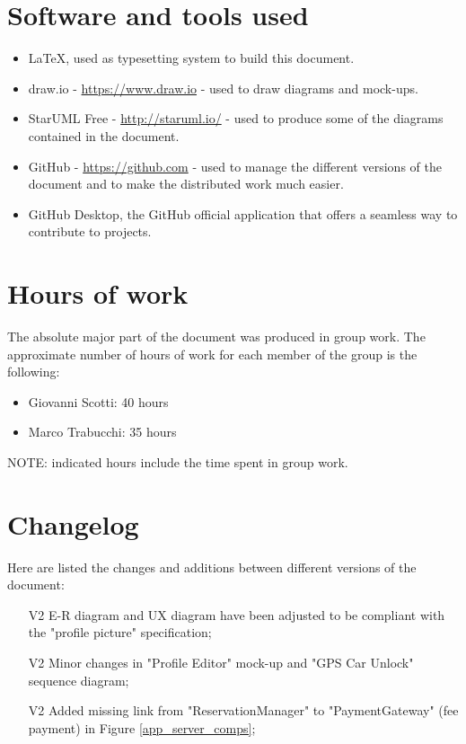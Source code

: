 \section{Software and tools used}
\begin{itemize}
\item \LaTeX, used as typesetting system to build this document.
\item draw.io - \url{https://www.draw.io} - used to draw diagrams and mock-ups.
\item StarUML Free - \url{http://staruml.io/} - used to produce some of the diagrams contained in the document.
\item GitHub - \url{https://github.com} - used to manage the different versions of the document and to make the distributed work much easier.
\item GitHub Desktop, the GitHub official application that offers a seamless way to contribute to projects.
\end{itemize}
\section{Hours of work}
The absolute major part of the document was produced in group work. The approximate number of hours of work for each member of the group is the following:

\begin{itemize}
\item Giovanni Scotti: 40 hours
\item Marco Trabucchi: 35 hours
\end{itemize}

NOTE: indicated hours include the time spent in group work.

\section{Changelog}
Here are listed the changes and additions between different versions of the document:
\begin{itemize}
\item[V2] E-R diagram and UX diagram have been adjusted to be compliant with the "profile picture" specification;
\item[V2] Minor changes in "Profile Editor" mock-up and "GPS Car Unlock" sequence diagram;
\item[V2] Added missing link from "ReservationManager" to "PaymentGateway" (fee payment) in Figure \ref{app_server_comps};
\end{itemize}
